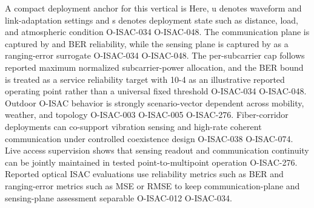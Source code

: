 {}
\markdownRendererSectionEnd \markdownRendererSectionBegin
{}\markdownRendererInterblockSeparator
{}A compact deployment anchor for this vertical is\markdownRendererInterblockSeparator
{}\markdownRendererInterblockSeparator
{}\markdownRendererInterblockSeparator
{}\markdownRendererInterblockSeparator
{}Here, u denotes waveform and link-adaptation settings and s denotes deployment state such as distance, load, and atmospheric condition O-ISAC-034 O-ISAC-048. The communication plane is captured by  and BER reliability, while the sensing plane is captured by  as a ranging-error surrogate O-ISAC-034 O-ISAC-048. The per-subcarrier cap  follows reported maximum normalized subcarrier-power allocation, and the BER bound is treated as a service reliability target with 10\markdownRendererCircumflex{}-4 as an illustrative reported operating point rather than a universal fixed threshold O-ISAC-034 O-ISAC-048.\markdownRendererParagraphSeparator
{}\markdownRendererInterblockSeparator
{}\markdownRendererUlBeginTight
\markdownRendererUlItem Outdoor O-ISAC behavior is strongly scenario-vector dependent across mobility, weather, and topology O-ISAC-003 O-ISAC-005 O-ISAC-276.\markdownRendererUlItemEnd 
\markdownRendererUlItem Fiber-corridor deployments can co-support vibration sensing and high-rate coherent communication under controlled coexistence design O-ISAC-038 O-ISAC-074.\markdownRendererUlItemEnd 
\markdownRendererUlItem Live access supervision shows that sensing readout and communication continuity can be jointly maintained in tested point-to-multipoint operation O-ISAC-276.\markdownRendererUlItemEnd 
\markdownRendererUlItem Reported optical ISAC evaluations use reliability metrics such as BER and ranging-error metrics such as MSE or RMSE to keep communication-plane and sensing-plane assessment separable O-ISAC-012 O-ISAC-034.\markdownRendererUlItemEnd 
\markdownRendererUlEndTight \markdownRendererInterblockSeparator
